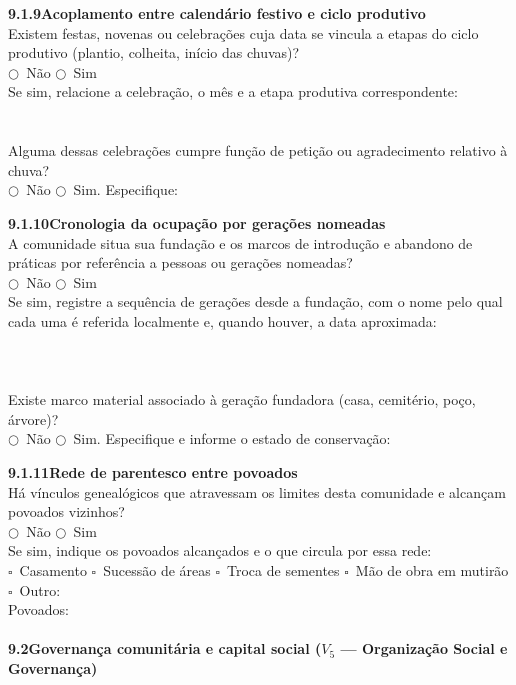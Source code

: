 \medskip\noindent\textbf{9.1.9\quad Acoplamento entre calendário festivo e ciclo produtivo}\\[2pt]
Existem festas, novenas ou celebrações cuja data se vincula a etapas do ciclo produtivo (plantio, colheita, início das chuvas)?\\
$\bigcirc$~Não \quad $\bigcirc$~Sim\\[2pt]
Se sim, relacione a celebração, o mês e a etapa produtiva correspondente:\\[2pt]
\dotfill\\[2pt]\dotfill\\[2pt]
Alguma dessas celebrações cumpre função de petição ou agradecimento relativo à chuva?\\
$\bigcirc$~Não \quad $\bigcirc$~Sim. Especifique: \dotfill

\medskip\noindent\textbf{9.1.10\quad Cronologia da ocupação por gerações nomeadas}\\[2pt]
A comunidade situa sua fundação e os marcos de introdução e abandono de práticas por referência a pessoas ou gerações nomeadas?\\
$\bigcirc$~Não \quad $\bigcirc$~Sim\\[2pt]
Se sim, registre a sequência de gerações desde a fundação, com o nome pelo qual cada uma é referida localmente e, quando houver, a data aproximada:\\[2pt]
\dotfill\\[2pt]\dotfill\\[2pt]\dotfill\\[2pt]
Existe marco material associado à geração fundadora (casa, cemitério, poço, árvore)?\\
$\bigcirc$~Não \quad $\bigcirc$~Sim. Especifique e informe o estado de conservação: \dotfill

\medskip\noindent\textbf{9.1.11\quad Rede de parentesco entre povoados}\\[2pt]
Há vínculos genealógicos que atravessam os limites desta comunidade e alcançam povoados vizinhos?\\
$\bigcirc$~Não \quad $\bigcirc$~Sim\\[2pt]
Se sim, indique os povoados alcançados e o que circula por essa rede:\\
$\square$~Casamento \quad $\square$~Sucessão de áreas \quad $\square$~Troca de sementes \quad $\square$~Mão de obra em mutirão \quad $\square$~Outro: \dotfill\\[2pt]
Povoados: \dotfill

\paragraph{9.2\quad Governança comunitária e capital social ($V_5$ --- Organização Social e Governança)}~\\[4pt]

